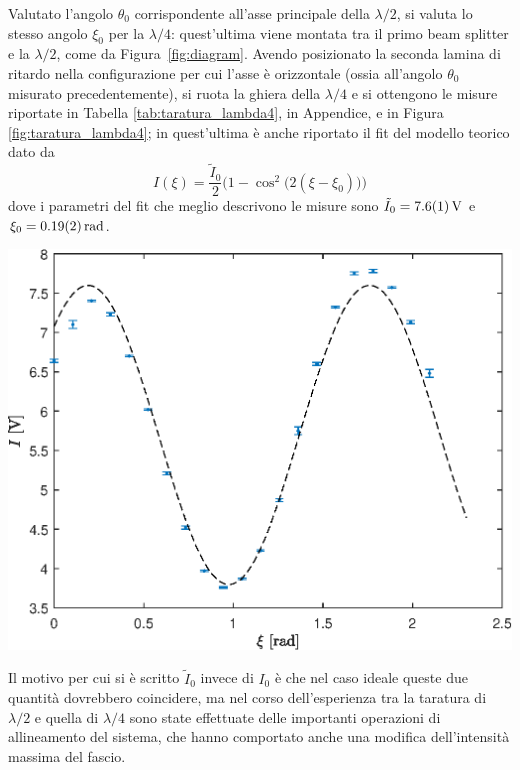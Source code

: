 \documentclass[10pt,oneside,a4paper]{article}
\newenvironment{Figure}
  {\par\medskip\noindent\minipage{\linewidth}}
  {\endminipage\par\medskip}
\begin{document}
\begin{multicols}{2}
Valutato l'angolo $\theta_0$ corrispondente all'asse principale della $\lambda/2$, si valuta lo stesso angolo $\xi_0$ per la $\lambda/4$: quest'ultima viene montata tra il primo beam splitter e la $\lambda/2$, come da Figura~\ref{fig:diagram}. Avendo posizionato la seconda lamina di ritardo nella configurazione per cui l'asse è orizzontale (ossia all'angolo $\theta_0$ misurato precedentemente), si ruota la ghiera della $\lambda/4$ e si ottengono le misure riportate in Tabella \ref{tab:taratura_lambda4}, in Appendice, e in Figura \ref{fig:taratura_lambda4}; in quest'ultima è anche riportato il fit del modello teorico dato da
\begin{equation}
	I(\xi) = \frac{\tilde{I}_0}{2}\Big( 1- \cos^2\big(2(\xi-\xi_0)\big)\Big)
\end{equation}
dove i parametri del fit che meglio descrivono le misure sono $\tilde{I}_0 = \SI{7.6\pm0.1}{V}$ e $\xi_0 = \SI{0.19\pm0.02}{rad}$.
\begin{Figure}
	\begin{center}
	\includegraphics[width=0.9\linewidth]{taratura_lambda4.eps}
	\label{fig:taratura_lambda4}
	\end{center}
\end{Figure}
Il motivo per cui si è scritto $\tilde{I}_0$ invece di $I_0$ è che nel caso ideale queste due quantità dovrebbero coincidere, ma nel corso dell'esperienza tra la taratura di $\lambda/2$ e quella di $\lambda/4$ sono state effettuate delle importanti operazioni di allineamento del sistema, che hanno comportato anche una modifica dell'intensità massima del fascio.


\end{multicols}
\end{document}
